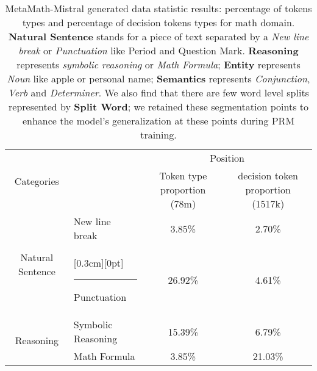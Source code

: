 \begin{table*}[htbp]
  \caption{MetaMath-Mistral generated data statistic results: percentage of tokens types and percentage of decision tokens types for math domain. \textbf{Natural Sentence} stands for a piece of text separated by a \textit{New line break} or \textit{Punctuation} like Period and Question Mark. \textbf{Reasoning} represents \textit{symbolic reasoning} or \textit{Math Formula}; \textbf{Entity} represents \textit{Noun} like apple or personal name; \textbf{Semantics} represents \textit{Conjunction}, \textit{Verb} and \textit{Determiner}. We also find that there are few word level splits represented by \textbf{Split Word}; we retained these segmentation points to enhance the model's generalization at these points during PRM training.}
    \noindent 
    \begin{minipage}{\textwidth}
    
   
   \setlength{\abovecaptionskip}{7pt}
   
   \vspace{-0.05in}
   
   \setlength{\cmidrulewidth}{0.01em}
   \renewcommand{\tabcolsep}{10pt}
   \renewcommand{\arraystretch}{1.2}
   \centering
   
   \begin{tabular}{cl|cc}
   
   \toprule
        \multirow{2}{*}{Categories} & \hspace{2.0em}\multirow{2}{*}{Subtypes} & \multicolumn{2}{c}{Position}\\
        \cmidrule[\cmidrulewidth](lr){3-4}
          && Token type proportion (78m) & decision token proportion (1517k)\\
         \midrule
         \multirow{2}{*}{Natural Sentence} &
          \vline \hspace{0.7em} New line break  & 3.85\% & 2.70\% \\
         & \raisebox{0pt}[0.3cm][0pt]{\rule{0.5pt}{1cm}}\hspace{1.4em} Punctuation  & 26.92\% & 4.61\% \\

         
         \multirow{2}{*}{Reasoning} & \vline \hspace{0.1em} Symbolic Reasoning  & 15.39\% & 6.79\% \\

         & \vline \hspace{0.8em} Math Formula &  3.85\% & 21.03\% \\
        

\end{tabular}
\end{minipage}
\end{table*}
